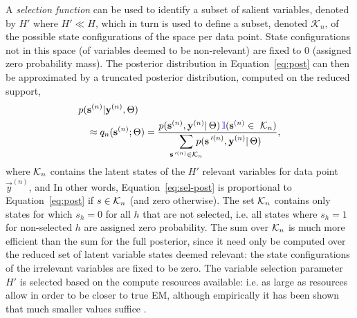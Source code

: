 A \textit{selection function} can be used to identify a  subset
of salient variables, denoted by $H'$ where $H' \ll H$, which in turn is used to define a subset, denoted $\mathcal{K}_n$, of the possible state configurations of the space per data point. 
State configurations not in this space (of variables deemed to be non-relevant) are fixed to $0$ (assigned zero probability mass).
%
The posterior distribution in Equation~\eqref{eq:post} can then be approximated by a truncated posterior distribution, computed on the reduced support,
%
\vspace{-.1cm}
\begin{align}
\label{eq:sel-post}
p(&\vec{s}^{(n)}|\vec{y}^{(n)},\Theta) \nonumber\\
&\approx q_n(\vec{s}^{(n)};\Theta) = \frac{p(\vec{s}^{(n)},\vec{y}^{(n)}|\,\Theta) \,\rev{\mathbb{I}}(\vec{s}^{(n)}\in\,\,\Kn)} %
{\disS\hspace{-1.5mm}\sum_{\vec{s}\Prime^{(n)}\in\mathcal{K}_n}\hspace{-3mm} p(\vec{s}\Prime^{(n)},\vec{y}^{(n)}|\,\Theta)},
\end{align}
\normalsize
%
where $\mathcal{K}_{n}$ contains the latent states of the $H'$ relevant variables for data point
$\vec{y}^{(n)}$, 
and 
In other words, Equation~\eqref{eq:sel-post} is proportional to Equation~\eqref{eq:post} if $s \in \mathcal{K}_{n}$ (and zero otherwise). 
The set $\mathcal{K}_{n}$ contains only states for which $s_h=0$ for all $h$ that are not selected, i.e. all states where $s_h=1$ for non-selected $h$ are assigned zero probability.
The sum over $\mathcal{K}_{n}$ is much more efficient than the sum for the full posterior, since it need only be computed over the reduced set of latent variable states deemed relevant: the state configurations of the irrelevant variables are fixed to be zero.
The variable selection parameter $H'$ is selected based on the compute resources available: i.e. as large as resources allow in order to be closer to true EM, although empirically it has been shown that much smaller values suffice  \citep[see e.g.][App. B on complexity-accuracy trade-offs]{SheikhEtAl2014}.

